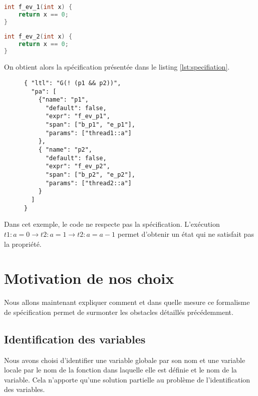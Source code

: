 \noindent\begin{minipage}{.45\textwidth}
\begin{lstlisting}[language=C, frame=single, caption=Proposition atomique p1]
int f_ev_1(int x) {
    return x == 0;
}
\end{lstlisting}
\end{minipage}\hfill
\begin{minipage}{.45\textwidth}
\begin{lstlisting}[language=C, frame=single, caption=Proposition atomique p2]
int f_ev_2(int x) {
    return x == 0;
}
\end{lstlisting}
\end{minipage}

On obtient alors la spécification présentée dans le listing
\ref{lst:specifiation}.

\begin{figure}[h]
\begin{lstlisting}[frame=single, caption=Spécification, label=lst:specifiation]
{ "ltl": "G(! (p1 && p2))",
  "pa": [
    {"name": "p1",
      "default": false,
      "expr": "f_ev_p1",
      "span": ["b_p1", "e_p1"],
      "params": ["thread1::a"]
    },
    { "name": "p2",
      "default": false,
      "expr": "f_ev_p2",
      "span": ["b_p2", "e_p2"],
      "params": ["thread2::a"]
    }
  ]
}
\end{lstlisting}
\end{figure}

Dans cet exemple, le code ne respecte pas la spécification. L'exécution
\(t1: a = 0 \rightarrow t2: a = 1 \rightarrow t2: a = a - 1\) permet
d'obtenir un état qui ne satisfait pas la propriété.

\section{Motivation de nos choix}

Nous allons maintenant expliquer comment et dans quelle mesure ce formalisme
de spécification permet de surmonter les obstacles détaillés précédemment.

\subsection{Identification des variables}

Nous avons choisi d'identifier une variable globale par son nom et une
variable locale par le nom de la fonction dans laquelle elle est définie
et le nom de la variable. Cela n'apporte qu'une solution partielle au problème
de l'identification des variables.


